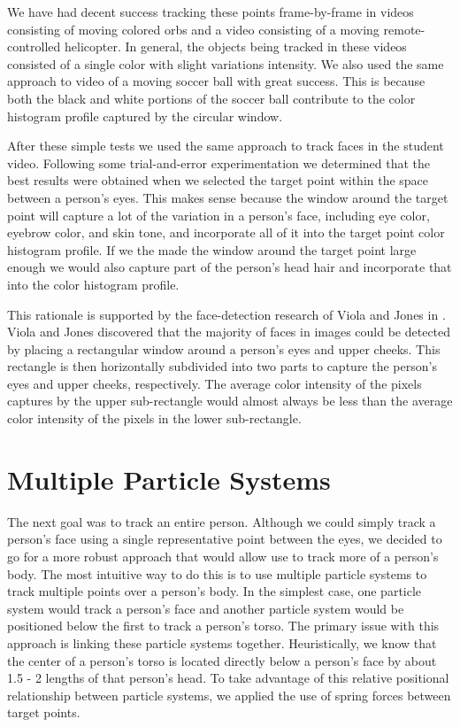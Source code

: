 \documentclass[11pt]{article}
\begin{document}
We have had decent success tracking these points frame-by-frame in videos consisting of moving colored orbs and a video consisting of a moving remote-controlled helicopter. In general, the objects being tracked in these videos consisted of a single color with slight variations intensity. We also used the same approach to video of a moving soccer ball with great success. This is because both the black and white portions of the soccer ball contribute to the color histogram profile captured by the circular window.

After these simple tests we used the same approach to track faces in the student video. Following some trial-and-error experimentation we determined that the best results were obtained when we selected the target point within the space between a person's eyes. This makes sense because the window around the target point will capture a lot of the variation in a person's face, including eye color, eyebrow color, and skin tone, and incorporate all of it into the target point color histogram profile. If we the made the window around the target point large enough we would also capture part of the person's head hair and incorporate that into the color histogram profile. 

This rationale is supported by the face-detection research of Viola and Jones in \cite{facedetection}. Viola and Jones discovered that the majority of faces in images could be detected by placing a rectangular window around a person's eyes and upper cheeks. This rectangle is then horizontally subdivided into two parts to capture the person's eyes and upper cheeks, respectively. The average color intensity of the pixels captures by the upper sub-rectangle would almost always be less than the average color intensity of the pixels in the lower sub-rectangle.  



\section{Multiple Particle Systems}
\label{sec:multparticlesys}

The next goal was to track an entire person. Although we could simply track a person's face using a single representative point between the eyes, we decided to go for a more robust approach that would allow use to track more of a person's body. The most intuitive way to do this is to use multiple particle systems to track multiple points over a person's body. In the simplest case, one particle system would track a person's face and another particle system would be positioned below the first to track a person's torso. The primary issue with this approach is linking these particle systems together. Heuristically, we know that the center of a person's torso is located directly below a person's face by about 1.5 - 2 lengths of that person's head. To take advantage of this relative positional relationship between particle systems, we applied the use of spring forces between target points.
\end{document}
